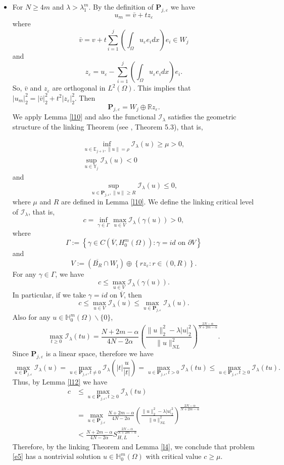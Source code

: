\documentclass[reqno]{amsart}
\newcommand{\la} {\lambda}
\newcommand{\eps}{\varepsilon}
\newcommand{\Om}{\Omega}
\newcommand{\al} {\alpha}
\newcommand{\mb} {\mathbb}
\newcommand{\mc} {\mathcal}
\numberwithin{theorem}{section} \numberwithin{equation}{section}
\begin{document}
\begin{itemize}
\item For $N\geq4m$ and $\la >\la^m_1$. By the definition of $\mathbf{P}_{j,\eps}$ we have
\[u_m=\bar{v}+t z_{ \eps}\]
where
\[\bar{v}=v+t \sum_{i=1}^j\left(\int_{\Om} u_{\eps}e_i d x\right) e_i \in W_j\]
and
\[z_{\eps}=u_{\eps}-\sum_{i=1}^j\left(\int_{\Om} u_{\eps}e_i d x\right) e_i.\]
So, $\bar{v}$ and $z_\eps$ are orthogonal in $L^2(\Om)$. This implies that
$|u_m|_2^2=|\bar{v}|_2^2+t^2 |z_\eps|_2 ^2$.
Then
\[\mathbf{P}_{j,\eps}={W}_j \oplus \mb{R} z_{\eps}.\]
We apply Lemma \ref{l10} and also the functional $\mc{I}_\la$ satisfies the geometric structure of the linking Theorem (see \cite{6rabinowitz1986minimax}, Theorem 5.3), that is,

\begin{gather*}
\inf _{u \in \mb{E}_{j+1}, \|u\|=\rho} \mc{I}_\la(u) \geq \mu>0, \\
\sup _{u \in \mb{Y}_ j} \mc{I}_\la(u)<0
\end{gather*}
and
\[\sup _{u \in \mathbf{P}_{j,\eps},\|u\| \geq R} \mc{I}_\la(u) \leq 0,\]
where $\mu$ and $R$ are defined in Lemma \ref{l10}. We define the linking critical level of $\mc{I}_\la$, that is,
\[
c=\inf _{\gamma \in \Gamma} \max _{u \in V} \mc{I}_\la(\gamma(u))>0,
\]
where
\[\Gamma:=\left\{\gamma \in C\left(\overline{V}, H_0^m(\Om)\right): \gamma=i d \text { on } \partial V\right\}\]
and
\[V:=\left(\overline{B_R} \cap {W}_{\jmath}\right) \oplus\left\{r z_\eps: r \in(0, R)\right\}.\]
For any $\gamma \in \Gamma$, we have
\[c\leq \max _{u \in V} \mc{I}_\la(\gamma(u)).\]
In particular, if we take $\gamma=i d$ on $\overline{V}$, then
\[c \leq \max _{u \in V} \mc{I}_\la(u) \leq \max _{u \in \mathbf{P}_{j,\eps}} \mc{I}_\la(u).\]
Also for any $u \in \mb{H}_0^m(\Om) \backslash\{0\}$,
\[\max _{t \geq 0} \mc{I}_\la(t u)=\frac{N+2m-\al}{4 N-2\al}\left(\frac{\|u\|_2^2-\la|u|_2^2}{\|u\|_{N L}^2}\right)^{\frac{2N-\al}{N+2m-\al}}.\]
Since $\mathbf{P}_{j,\eps}$ is a linear space, therefore we have
\[\max _{u \in \mathbf{P}_{j,\eps}} \mc{I}_\la(u)=\max _{u \in \mathbf{P}_{j,\eps}, t \neq 0} \mc{I}_\la\left(|t| \frac{u}{|t|}\right)=\max _{u \in \mathbf{P}_{j,\eps}, t>0} \mc{I}_\la(t u) \leq \max _{u \in \mathbf{P}_{j,\eps}, t \geq 0} \mc{I}_\la(t u).\]
Thus, by Lemma \ref{l12} we have
\begin{align*}
c & \leq \max _{u \in \mathbf{P}_{j,\eps},t \geq 0} \mc{I}_\la(tu) \\
& =\max _{u \in \mathbf{P}_{j,\eps}} \frac{N+2m-\al}{4 N-2\al}\left(\frac{\|u\|_2^2-\la|u|_2^2}{\|u\|_{N L}^2}\right)^{\frac{2N-\al}{N+2m-\al}} \\
& <\frac{N+2m-\al}{4N-2\al} S_{H, L}^{\frac{2N-\al}{N+2m-\al}}.
\end{align*}
Therefore, by  the linking Theorem and Lemma \ref{l4}, we conclude that problem \eqref{e5} has a nontrivial solution $u \in \mb{H}_0^m(\Om)$ with critical value $c\geq \mu$.\\


\end{itemize}
\end{document}
